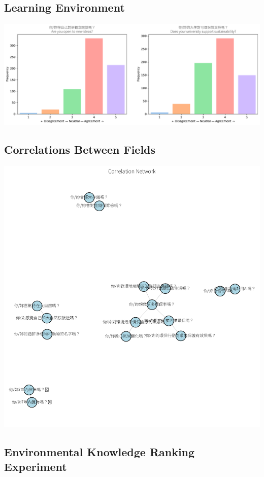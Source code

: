 \documentclass[
  letterpaper,
  DIV=11,
  numbers=noendperiod]{scrartcl}
\begin{document}
\subsection{Learning Environment}\label{learning-environment}

\includegraphics{_thesis_files/figure-pdf/cell-70-output-1.pdf}

\subsection{Correlations Between
Fields}\label{correlations-between-fields}

\includegraphics{_thesis_files/figure-pdf/cell-71-output-1.pdf}

\subsection{Environmental Knowledge Ranking
Experiment}\label{environmental-knowledge-ranking-experiment}
\end{document}
